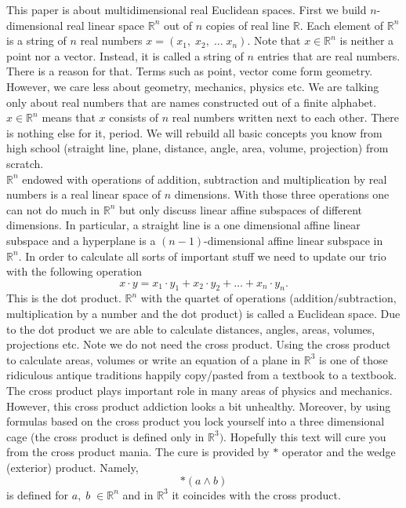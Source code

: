 \documentclass[color=black,11pt]{elegantpaper}
\begin{document}
This paper is about multidimensional real Euclidean spaces. First we build $n$-dimensional real linear space $\mathbb{R}^n$ out of $n$ copies of real line $\mathbb{R}.$ Each element of $\mathbb{R}^n$ is a string of $n$ real numbers $x=(x_1,\;x_2,\;\dots\;x_n).$ Note that $x \in \mathbb{R}^n$ is neither a point nor a vector. Instead, it is called a string of $n$ entries that are real numbers.  There is a reason for that. Terms such as point, vector come form geometry. However, we care less about geometry, mechanics, physics etc. We are talking only about real numbers that are names constructed out of a finite alphabet. $x\in \mathbb{R}^n$ means that $x$ consists of $n$ real numbers written next to each other. There is nothing else for it, period. We will rebuild all basic concepts you know from high school (straight line, plane, distance, angle, area, volume, projection) from scratch. \\
$\mathbb{R}^n$ endowed with operations of  addition, subtraction and multiplication by real numbers is a real linear space of $n$ dimensions. With those three operations one can not do much in $\mathbb{R}^n$ but only discuss linear affine subspaces of different dimensions. In particular, a straight line is a one dimensional affine linear subspace and a hyperplane is a $(n-1)$-dimensional affine linear subspace in $\mathbb{R}^n.$ In order to calculate all sorts of important stuff we need to update our trio with the following operation
$$
x\cdot y = x_1 \cdot y_1 + x_2 \cdot y_2 + \dots + x_n \cdot y_n.
$$
This is the dot product. $\mathbb{R}^n$ with the quartet of operations (addition/subtraction, multiplication by a number and the dot product) is called a Euclidean space. Due to the dot product we are able to calculate distances, angles, areas, volumes, projections etc. Note we do not need the cross product. Using the cross product to calculate areas, volumes or write an equation of a plane in $\mathbb{R}^3$ is one of those ridiculous antique traditions happily copy/pasted from a textbook to a textbook. The cross product plays important role in many areas of physics and mechanics. However, this cross product addiction looks a bit unhealthy. Moreover, by using formulas based on the cross product you lock yourself into a three dimensional cage (the cross product is defined only in $\mathbb{R}^3).$ Hopefully this text will cure you from the cross product mania. The cure is provided by $\ast$ operator and the wedge (exterior) product. Namely,
$$
\ast (a\wedge b)
$$  
is defined for $a,\;b\;\in \mathbb{R}^n$ and in $\mathbb{R}^3$ it coincides with the cross product.\\
\end{document}
